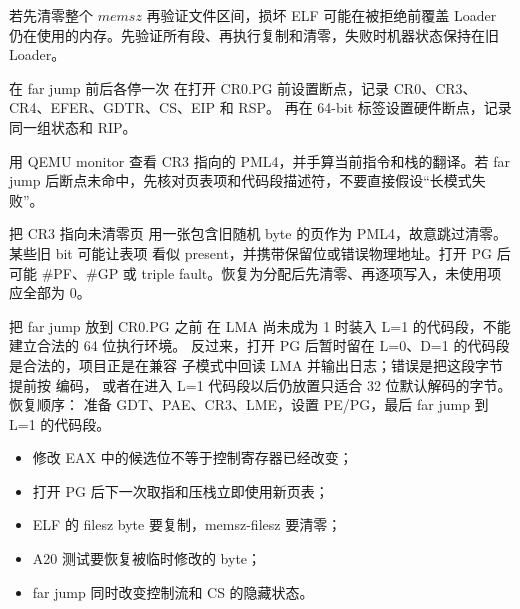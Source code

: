 若先清零整个 \(memsz\) 再验证文件区间，损坏 ELF 可能在被拒绝前覆盖 Loader
仍在使用的内存。先验证所有段、再执行复制和清零，失败时机器状态保持在旧
Loader。

\begin{experimentbox}{在 far jump 前后各停一次}
在打开 CR0.PG 前设置断点，记录 CR0、CR3、CR4、EFER、GDTR、CS、EIP 和 RSP。
再在 64-bit 标签设置硬件断点，记录同一组状态和 RIP。

用 QEMU monitor 查看 CR3 指向的 PML4，并手算当前指令和栈的翻译。若 far
jump 后断点未命中，先核对页表项和代码段描述符，不要直接假设“长模式失败”。
\end{experimentbox}

\begin{faultinjectionbox}{把 CR3 指向未清零页}
用一张包含旧随机 byte 的页作为 PML4，故意跳过清零。某些旧 bit 可能让表项
看似 present，并携带保留位或错误物理地址。打开 PG 后可能 \#PF、\#GP 或
triple fault。恢复为分配后先清零、再逐项写入，未使用项应全部为 0。
\end{faultinjectionbox}

\begin{faultinjectionbox}{把 far jump 放到 CR0.PG 之前}
在 LMA 尚未成为 1 时装入 L=1 的代码段，不能建立合法的 64 位执行环境。
反过来，打开 PG 后暂时留在 L=0、D=1 的代码段是合法的，项目正是在兼容
子模式中回读 LMA 并输出日志；错误是把这段字节提前按  编码，
或者在进入 L=1 代码段以后仍放置只适合 32 位默认解码的字节。恢复顺序：
准备 GDT、PAE、CR3、LME，设置 PE/PG，最后 far jump 到 L=1 的代码段。
\end{faultinjectionbox}

\begin{pitfallbox}
\begin{itemize}[leftmargin=2.2em]
  \item 修改 EAX 中的候选位不等于控制寄存器已经改变；
  \item 打开 PG 后下一次取指和压栈立即使用新页表；
  \item ELF 的 filesz byte 要复制，memsz-filesz 要清零；
  \item A20 测试要恢复被临时修改的 byte；
  \item far jump 同时改变控制流和 CS 的隐藏状态。
\end{itemize}
\end{pitfallbox}


